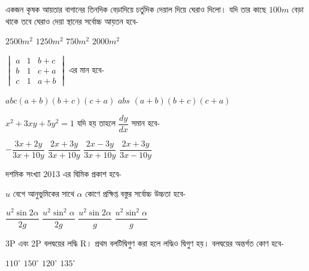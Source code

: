 \documentclass[addpoints]{exam}
\begin{document}
\begin{questions}
\question  একজন কৃষক আয়তার বাগানের তিনদিক বেড়াদিয়ে চর্তুদিক দেয়াল দিয়ে ঘেরাও দিলো। যদি তার কাছে $100m$ বেড়া থাকে তবে ঘেরাও দেয়া স্থানের সর্বোচ্চ আয়তন হবে-
 
\begin{oneparchoices}
\choice $ 2500m^{2} $
\choice $ 1250m^{2} $
\choice $ 750m^{2} $
\choice $ 2000m^{2} $
\end{oneparchoices}

\question $\begin{vmatrix}
a & 1 & b+c \\
b & 1 & c+a\\
c & 1 & a+b
\end{vmatrix} $  এর মান হবে-

\begin{oneparchoices}
\choice $ abc(a+b)(b+c)(c+a) $
\choice $ abs $
\choice  $ (a+b)(b+c)(c+a) $
\end{oneparchoices}

\question  $ x^{2}+3xy+5y^{2}=1 $ যদি হয় তাহলে $ \dfrac{dy}{dx} $ সমান হবে-

\begin{oneparchoices}
\choice $ -\dfrac{3x+2y}{3x+10y} $
\choice $ \dfrac{2x+3y}{3x+10y} $
\choice $ \dfrac{2x-3y}{3x+10y} $
\choice $ \dfrac{2x+3y}{3x-10y} $
\end{oneparchoices}

\question   দশমিক সংখ্যা 2013 এর দ্বিমিক প্রকাশ হবে-

\begin{oneparchoices}

\end{oneparchoices}

\question  $ u $ বেগে আনুভুমিকের সাথে $ \alpha $ কোণে প্রক্ষিপ্ত বস্তুর সর্বোচ্চ উচ্চতা হবে-

\begin{oneparchoices}
\choice $ \dfrac{u^{2}\sin 2\alpha}{2g} $
\choice $ \dfrac{u^{2}\sin^{2}\alpha}{2g} $
\choice $ \dfrac{u^{2}\sin 2\alpha}{g} $
\choice $ \dfrac{u^{2}\sin^{2}\alpha}{g} $

\end{oneparchoices}

\question  3P এবং 2P বলদ্বয়ের লদ্ধি R। প্রথম বলটিদ্বিগুণ করা হলে লদ্ধিও দ্বিগুণ হয়। বলদ্বয়ের অন্তর্গত কোণ হবে-

\begin{oneparchoices}
\choice $ 110^{\circ} $
\choice $ 150^{\circ} $
\choice $ 120^{\circ} $
\choice $ 135^{\circ} $


\end{oneparchoices}
\end{questions}
\end{document}
